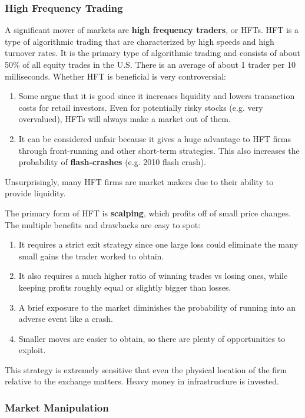 \documentclass{article}
\begin{document}
  \subsubsection{High Frequency Trading}

  A significant mover of markets are \textbf{high frequency traders}, or HFTs. HFT is a type of algorithmic trading that are characterized by high speeds and high turnover rates. It is the primary type of algorithmic trading and consists of about 50\% of all equity trades in the U.S. There is an average of about 1 trader per 10 milliseconds. Whether HFT is beneficial is very controversial: 
  \begin{enumerate}
      \item Some argue that it is good since it increases liquidity and lowers transaction costs for retail investors. Even for potentially risky stocks (e.g. very overvalued), HFTs will always make a market out of them. 
      \item It can be considered unfair because it gives a huge advantage to HFT firms through front-running and other short-term strategies. This also increases the probability of \textbf{flash-crashes} (e.g. 2010 flash crash). 
  \end{enumerate}
  Unsurprisingly, many HFT firms are market makers due to their ability to provide liquidity. 

  The primary form of HFT is \textbf{scalping}, which profits off of small price changes. The multiple benefits and drawbacks are easy to spot: 
  \begin{enumerate}
      \item It requires a strict exit strategy since one large loss could eliminate the many small gains the trader worked to obtain. 
      \item It also requires a much higher ratio of winning trades vs losing ones, while keeping profits roughly equal or slightly bigger than losses. 
      \item A brief exposure to the market diminishes the probability of running into an adverse event like a crash. 
      \item Smaller moves are easier to obtain, so there are plenty of opportunities to exploit. 
  \end{enumerate}
  This strategy is extremely sensitive that even the physical location of the firm relative to the exchange matters. Heavy money in infrastructure is invested. 


  \subsubsection{Market Manipulation}
\end{document}
